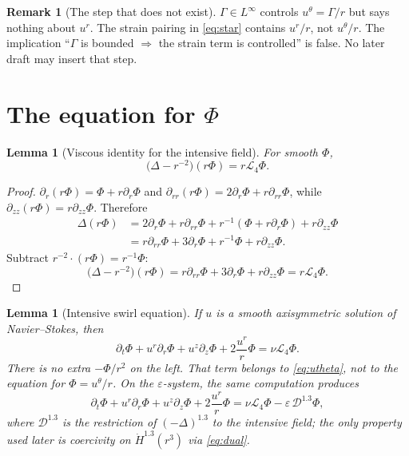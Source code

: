 \documentclass[11pt]{article}
\newtheorem{lemma}[theorem]{Lemma}
\theoremstyle{definition}
\newtheorem{remark}[theorem]{Remark}
\newcommand{\eps}{\varepsilon}
\newcommand{\ur}{u^{r}}
\newcommand{\uz}{u^{z}}
\newcommand{\ut}{u^{\theta}}
\newcommand{\Ph}{\Phi}
\newcommand{\Ga}{\Gamma}
\newcommand{\Lfour}{\mathcal{L}_{4}}
\newcommand{\Hdot}{\dot{H}}
\newcommand{\Lint}{L^{\infty}}
\begin{document}
\begin{remark}[The step that does not exist]
\label{rem:no-slide}
\(\Ga\in\Lint\) controls \(\ut=\Ga/r\) but says nothing about \(\ur\).
The strain pairing in \eqref{eq:star} contains \(\ur/r\), not \(\ut/r\).
The implication ``\(\Ga\) is bounded \(\Rightarrow\) the strain term is
controlled'' is false. No later draft may insert that step.
\end{remark}

\section{The equation for \(\Phi\)}
\label{sec:Phi-eq}

\begin{lemma}[Viscous identity for the intensive field]
\label{lem:L4}
For smooth \(\Ph\),
\begin{equation}
  \label{eq:L4id}
  \bigl(\Delta-r^{-2}\bigr)(r\Ph)=r\Lfour\Ph.
\end{equation}
\end{lemma}

\begin{proof}
\(\partial_r(r\Ph)=\Ph+r\partial_r\Ph\) and
\(\partial_{rr}(r\Ph)=2\partial_r\Ph+r\partial_{rr}\Ph\),
while \(\partial_{zz}(r\Ph)=r\partial_{zz}\Ph\). Therefore
\begin{align*}
\Delta(r\Ph)
&=2\partial_r\Ph+r\partial_{rr}\Ph
 +r^{-1}(\Ph+r\partial_r\Ph)
 +r\partial_{zz}\Ph\\
&=r\partial_{rr}\Ph+3\partial_r\Ph+r^{-1}\Ph+r\partial_{zz}\Ph.
\end{align*}
Subtract \(r^{-2}\cdot(r\Ph)=r^{-1}\Ph\):
\[
  \bigl(\Delta-r^{-2}\bigr)(r\Ph)
  =r\partial_{rr}\Ph+3\partial_r\Ph+r\partial_{zz}\Ph
  =r\Lfour\Ph.
\]
\end{proof}

\begin{lemma}[Intensive swirl equation]
\label{lem:Phi}
If \(u\) is a smooth axisymmetric solution of Navier--Stokes, then
\begin{equation}
  \label{eq:Phi}
  \partial_t\Ph+\ur\partial_r\Ph+\uz\partial_z\Ph
  +2\frac{\ur}{r}\Ph
  =\nu\Lfour\Ph.
\end{equation}
There is no extra \(-\Ph/r^2\) on the left. That term belongs to
\eqref{eq:utheta}, not to the equation for \(\Ph=\ut/r\).
On the \(\eps\)-system, the same computation produces
\begin{equation}
  \label{eq:Phieps}
  \partial_t\Ph+\ur\partial_r\Ph+\uz\partial_z\Ph
  +2\frac{\ur}{r}\Ph
  =\nu\Lfour\Ph-\eps\,\mathcal{D}^{1.3}\Ph,
\end{equation}
where \(\mathcal{D}^{1.3}\) is the restriction of \((-\Delta)^{1.3}\)
to the intensive field; the only property used later is coercivity on
\(\Hdot^{1.3}(r^3)\) via \eqref{eq:dual}.
\end{lemma}
\end{document}
